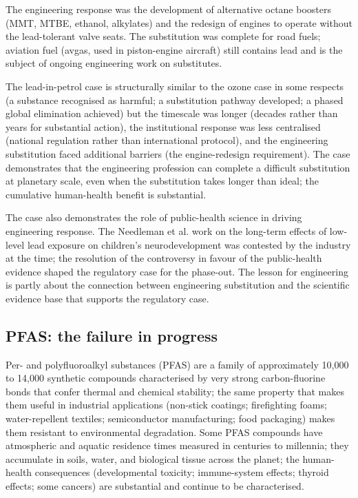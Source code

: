 The engineering response was the development of alternative octane boosters (MMT, MTBE, ethanol, alkylates) and the redesign of engines to operate without the lead-tolerant valve seats. The substitution was complete for road fuels; aviation fuel (avgas, used in piston-engine aircraft) still contains lead and is the subject of ongoing engineering work on substitutes.

The lead-in-petrol case is structurally similar to the ozone case in some respects (a substance recognised as harmful; a substitution pathway developed; a phased global elimination achieved) but the timescale was longer (decades rather than years for substantial action), the institutional response was less centralised (national regulation rather than international protocol), and the engineering substitution faced additional barriers (the engine-redesign requirement). The case demonstrates that the engineering profession can complete a difficult substitution at planetary scale, even when the substitution takes longer than ideal; the cumulative human-health benefit is substantial.

The case also demonstrates the role of public-health science in driving engineering response. The Needleman et al. work on the long-term effects of low-level lead exposure on children's neurodevelopment was contested by the industry at the time; the resolution of the controversy in favour of the public-health evidence shaped the regulatory case for the phase-out. The lesson for engineering is partly about the connection between engineering substitution and the scientific evidence base that supports the regulatory case.

\subsection*{PFAS: the failure in progress}

Per- and polyfluoroalkyl substances (PFAS) are a family of approximately 10,000 to 14,000 synthetic compounds characterised by very strong carbon-fluorine bonds that confer thermal and chemical stability; the same property that makes them useful in industrial applications (non-stick coatings; firefighting foams; water-repellent textiles; semiconductor manufacturing; food packaging) makes them resistant to environmental degradation. Some PFAS compounds have atmospheric and aquatic residence times measured in centuries to millennia; they accumulate in soils, water, and biological tissue across the planet; the human-health consequences (developmental toxicity; immune-system effects; thyroid effects; some cancers) are substantial and continue to be characterised.

